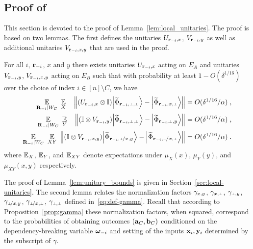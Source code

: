 \subsection{Proof of }
\label{sec:anchorpr_main_lemma}

This section is devoted to the proof of Lemma~\ref{lem:local_unitaries}. The proof is based on two lemmas. The first defines the unitaries $U_{\mathbf{r}_{-i},x}$, $V_{\mathbf{r}_{-i},y}$ as well as additional unitaries $V_{\mathbf{r}_{-i},x,y}$ that are used in the proof. %

\begin{lemma}
\label{lem:unitary_bounds}
For all $i$, $\mathbf{r}_{-i}$, $x$ and $y$ there exists unitaries $U_{\mathbf{r}_{-i}, x}$ acting on $E_A$ and unitaries $V_{\mathbf{r}_{-i}, y}$, $V_{{\mathbf{r}_{-i} , x,y}}$ acting on $E_B$ such that with probability at least $1 - O(\delta^{1/16})$ over the choice of index $i \in [n] \setminus C$, we have
\begin{align}
	\Ex_{\bR_\mi | W_C} \,\, \Ex_X \,\,\,\, \, \, \left \|(U_{\br_\mi, x} \otimes \Id)  \bigket{\wt{\Phi}_\sspp} - \bigket{\wt{\Phi}_\ssxp }   \right \| &=  O(\delta^{1/16}/\alpha)\;,\label{eq:ux_bound}\\
	\Ex_{\bR_\mi | W_C} \,\, \Ex_Y \,\, \,\, \, \, \left \| (\Id \otimes V_{\br_\mi,y})  \bigket{\wt{\Phi}_\sspp}  - \bigket{\wt{\Phi}_\sspy }  \right \| &=  O(\delta^{1/16}/\alpha)\;,\label{eq:vy_bound}\\
	\Ex_{\bR_\mi | W_C} \,\, \Ex_{XY} \,\,  \left \|  (\Id \otimes V_{\ssxy})  \bigket{\wt{\Phi}_\sspxy}  - \bigket{\wt{\Phi}_\sspxp }  \right \| &=  O(\delta^{1/16}/\alpha)\;.\label{eq:vxy_bound}
		\end{align}
		where $\operatorname*{\mathbb{E}}_X$, $\operatorname*{\mathbb{E}}_Y$, and $\operatorname*{\mathbb{E}}_{XY}$ denote expectations under $\mu_X(x)$, $\mu_Y(y)$, and $\mu_{XY}(x,y)$ respectively.
\end{lemma}

The proof of Lemma~\ref{lem:unitary_bounds} is given in Section~\ref{sec:local-unitaries}.
The second lemma relates the normalization factors $\gamma_{x,y}$, $\gamma_{\xp}$, $\gamma_{\py}$, $\gamma_{\pxy}$, $\gamma_{\pxp}$, $\gamma_{\pp}$ defined in~\eqref{eq:def-gamma}. Recall that according to Proposition~\ref{prop:gamma} these normalization factors, when squared, correspond to the probabilities of obtaining outcomes $(\mathbf{a}_C,\mathbf{b}_C)$ conditioned on the dependency-breaking variable ${\boldsymbol{\omega}}_{-i}$ and setting of the inputs $\mathbf{x}_i,\mathbf{y}_i$ determined by the subscript of $\gamma$.

